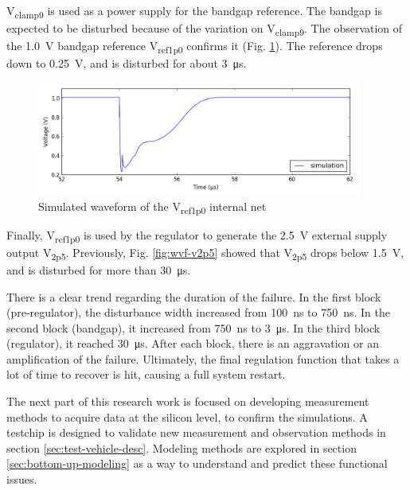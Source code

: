 V\textsubscript{clamp9} is used as a power supply for the bandgap reference.
The bandgap is expected to be disturbed because of the variation on V\textsubscript{clamp9}.
The observation of the \SI{1.0}{\volt} bandgap reference V\textsubscript{ref1p0} confirms it (Fig. \ref{fig:wvf-v1p0}).
The reference drops down to \SI{0.25}{\volt}, and is disturbed for about \SI{3}{\micro\second}.

\begin{figure}[!h]
  \centering
  \includegraphics[width=0.95\textwidth]{src/3/figures/v1p0.png}
  \caption{Simulated waveform of the V\textsubscript{ref1p0} internal net}
  \label{fig:wvf-v1p0}
\end{figure}

Finally, V\textsubscript{ref1p0} is used by the regulator to generate the \SI{2.5}{\volt} external supply output V\textsubscript{2p5}.
Previously,  Fig. \ref{fig:wvf-v2p5} showed that V\textsubscript{2p5} drops below \SI{1.5}{\volt}, and is disturbed for more than \SI{30}{\micro\second}.

There is a clear trend regarding the duration of the failure.
In the first block (pre-regulator), the disturbance width increased from \SI{100}{\nano\second} to \SI{750}{\nano\second}.
In the second block (bandgap), it increased from \SI{750}{\nano\second} to \SI{3}{\micro\second}.
In the third block (regulator), it reached \SI{30}{\micro\second}.
After each block, there is an aggravation or an amplification of the failure.
Ultimately, the final regulation function that takes a lot of time to recover is hit, causing a full system restart.

The next part of this research work is focused on developing measurement methods to acquire data at the silicon level, to confirm the simulations.
A testchip is designed to validate new measurement and observation methods in section \ref{sec:test-vehicle-desc}.
Modeling methods are explored in section \ref{sec:bottom-up-modeling} as a way to understand and predict these functional issues.
